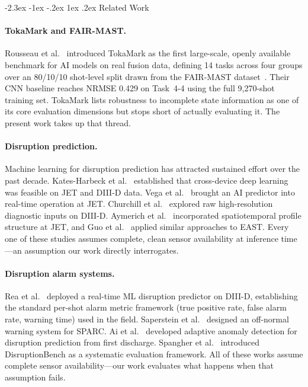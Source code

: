 \documentclass[10pt,twocolumn]{article}
\makeatletter
\renewcommand\section{\@startsection{section}{1}{\z@}%
  {-2.3ex \@plus -1ex \@minus -.2ex}%
  {1ex \@plus .2ex}%
  {\normalfont\Large\bfseries}}
\makeatother
\begin{document}
\section{Related Work}

\paragraph{TokaMark and FAIR-MAST.}
Rousseau et al.~\cite{rousseau2026tokamark} introduced TokaMark as the
first large-scale, openly available benchmark for AI models on real
fusion data, defining 14 tasks across four groups over an 80/10/10
shot-level split drawn from the FAIR-MAST
dataset~\cite{jackson2024softwarex, jackson2025ieee}. Their CNN baseline
reaches NRMSE 0.429 on Task~4-4 using the full 9,270-shot training set.
TokaMark lists robustness to incomplete state information as one of its
core evaluation dimensions but stops short of actually evaluating it.
The present work takes up that thread.

\paragraph{Disruption prediction.}
Machine learning for disruption prediction has attracted sustained
effort over the past decade. Kates-Harbeck et al.~\cite{katesharbeck2019}
established that cross-device deep learning was feasible on JET and
DIII-D data. Vega et al.~\cite{vega2022} brought an AI predictor into
real-time operation at JET. Churchill et al.~\cite{churchill2020} explored
raw high-resolution diagnostic inputs on DIII-D. Aymerich et
al.~\cite{aymerich2022} incorporated spatiotemporal profile structure
at JET, and Guo et al.~\cite{guo2021} applied similar approaches to EAST.
Every one of these studies assumes complete, clean sensor availability
at inference time—an assumption our work directly interrogates.

\paragraph{Disruption alarm systems.}
Rea et al.~\cite{rea2019} deployed a real-time ML disruption predictor
on DIII-D, establishing the standard per-shot alarm metric framework
(true positive rate, false alarm rate, warning time) used in the field.
Saperstein et al.~\cite{saperstein2025} designed an off-normal warning
system for SPARC. Ai et al.~\cite{ai2025} developed adaptive anomaly
detection for disruption prediction from first discharge. Spangher et
al.~\cite{spangher2025} introduced DisruptionBench as a systematic
evaluation framework. All of these works assume complete sensor
availability—our work evaluates what happens when that assumption fails.
\end{document}
